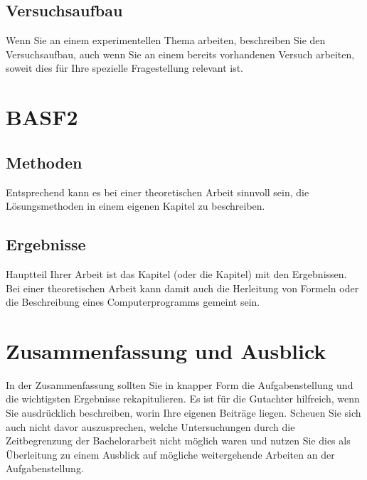 \documentclass[a4paper,11pt,oneside,final,german,openbib,pdftex]{scrbook}
\begin{document}
\section{Versuchsaufbau}

Wenn Sie an einem experimentellen Thema arbeiten, beschreiben Sie 
den Versuchsaufbau, auch wenn Sie an einem bereits vorhandenen 
Versuch arbeiten, soweit dies f\"ur Ihre spezielle Fragestellung 
relevant ist. 


\chapter{BASF2}
\label{BASF2}


\section{Methoden}

Entsprechend kann es bei einer theoretischen Arbeit sinnvoll sein,
die L\"osungsmethoden in einem eigenen Kapitel zu beschreiben.

\section{Ergebnisse}

Hauptteil Ihrer Arbeit ist das Kapitel (oder die Kapitel) mit den 
Ergebnissen. Bei einer theoretischen Arbeit kann damit auch 
die Herleitung von Formeln oder die Beschreibung eines Computerprogramms 
gemeint sein.

\chapter{Zusammenfassung und Ausblick}

In der Zusammenfassung sollten Sie in knapper Form die Aufgabenstellung 
und die wichtigsten Ergebnisse rekapitulieren. Es ist f\"ur die 
Gutachter hilfreich, wenn Sie ausdr\"ucklich beschreiben, worin 
Ihre eigenen Beitr\"age liegen. Scheuen Sie sich auch nicht davor 
auszusprechen, welche Untersuchungen durch die Zeitbegrenzung der 
Bachelorarbeit nicht m\"oglich waren und nutzen Sie dies als 
\"Uberleitung zu einem Ausblick auf m\"ogliche weitergehende 
Arbeiten an der Aufgabenstellung.
\end{document}
